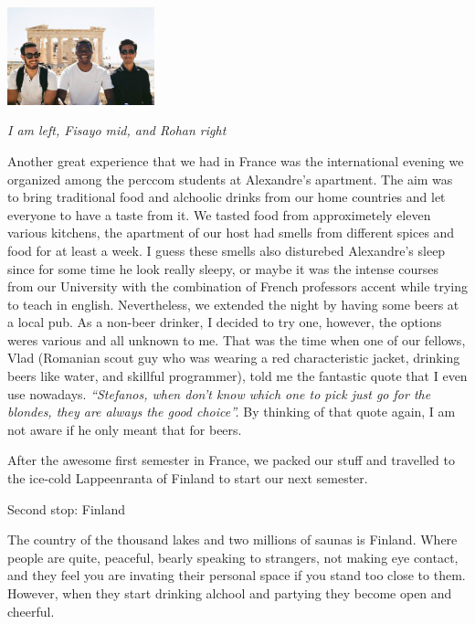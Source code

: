 \documentclass[10pt,a4paper]{article} %
\newcommand{\NewsItem}[1]{ %
\usefont{T1}{fvs}{n}{n} %
\vspace{24pt}\large #1\vspace{3pt} %
\par \normalsize \normalfont}
\begin{document}
\begin{multicols}{3}
\begin{center}
	\includegraphics[width=0.32\textwidth]{media/stef_fisayo_rohan.jpg}
	\par\textit{I am left, Fisayo mid, and Rohan right}
\end{center}


Another great experience that we had in France was the international evening 
we organized among the {\sc perccom} students at Alexandre's apartment. 
The aim was to bring traditional food and alchoolic drinks from our home countries 
and let everyone to have a taste from it. 
We tasted food from approximetely eleven various kitchens, the apartment of our 
host had smells from different spices and food for at least a week. 
I guess these smells also disturebed Alexandre's sleep since for some time he look 
really sleepy, or maybe it was the intense courses from our University with the 
combination of French professors accent while trying to teach in english.  
Nevertheless, we extended the night by having some beers at a local pub. 
As a non-beer drinker, I decided to try one, however, the options weres various 
and all unknown to me. 
That was the time when one of our fellows, Vlad (Romanian scout guy who was wearing a 
red characteristic jacket, drinking beers like water, and skillful programmer), 
told me the fantastic quote that I even use nowadays. 
\textit{``Stefanos, when don't know which one to pick just go for the blondes, 
	they are always the good choice''.} 
By thinking of that quote again, I am not aware if he only meant that for beers.


After the awesome first semester in France, we packed our stuff and travelled 
to the ice-cold Lappeenranta of Finland to start our next semester.


\NewsItem{Second stop: Finland}

The country of the thousand lakes and two millions of saunas is Finland. 
Where people are quite, peaceful, bearly speaking to strangers, not making eye 
contact, and they feel you are invating their personal space if you stand too 
close to them. 
However, when they start drinking alchool and partying they become open and cheerful. 
   

\end{multicols}
\end{document}
